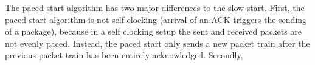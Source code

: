 The paced start algorithm has two major differences to the slow start. First, the paced start algorithm is not self clocking (arrival of an ACK triggers the sending of a package), because in a self clocking setup the sent and received packets are not evenly paced. Instead, the paced start only sends a new packet train after the previous packet train has been entirely acknowledged. Secondly, 



